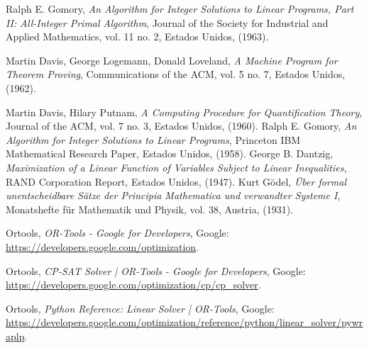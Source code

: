 \documentclass[12pt]{report}
\begin{document}
\begin{thebibliography}{8}
Ralph E. Gomory, \textit{An Algorithm for Integer Solutions to Linear Programs, Part II: All-Integer Primal Algorithm}, Journal of the Society for Industrial and Applied Mathematics,  vol. 11 no. 2, Estados Unidos, (1963).

Martin Davis, George Logemann, Donald Loveland, \textit{A Machine Program for Theorem Proving}, Communications of the ACM, vol. 5 no. 7, Estados Unidos, (1962).

Martin Davis, Hilary Putnam, \textit{A Computing Procedure for Quantification Theory}, Journal of the ACM, vol. 7 no. 3, Estados Unidos, (1960).
Ralph E. Gomory, \textit{An Algorithm for Integer Solutions to Linear Programs}, Princeton IBM Mathematical Research Paper, Estados Unidos, (1958).
George B. Dantzig, \textit{Maximization of a Linear Function of Variables Subject to Linear Inequalities}, RAND Corporation Report, Estados Unidos, (1947).
Kurt Gödel, \textit{Über formal unentscheidbare Sätze der Principia Mathematica und verwandter Systeme I}, Monatshefte für Mathematik und Physik, vol. 38, Austria, (1931).

Ortools, \textit{OR-Tools - Google for Developers}, Google: \url{https://developers.google.com/optimization}.

Ortools, \textit{CP-SAT Solver | OR-Tools - Google for Developers}, Google: \url{https://developers.google.com/optimization/cp/cp_solver}.

Ortools, \textit{Python Reference: Linear Solver | OR-Tools}, Google: \url{https://developers.google.com/optimization/reference/python/linear_solver/pywraplp}.

\end{thebibliography}
\end{document}
